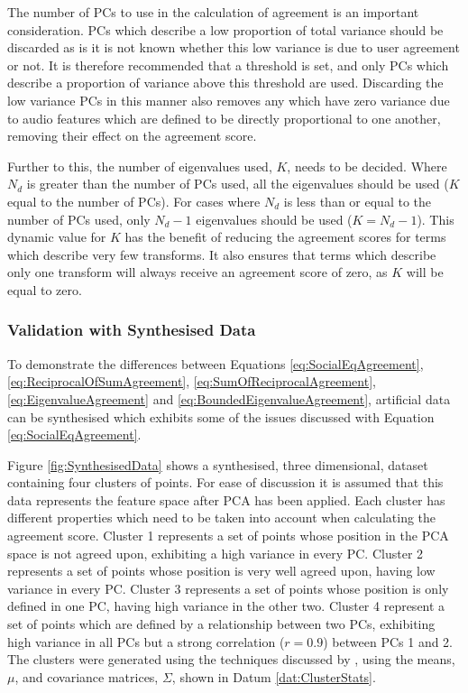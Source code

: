 			The number of PCs to use in the calculation of agreement is an important consideration. PCs which
			describe a low proportion of total variance should be discarded as is it is not known whether this
			low variance is due to user agreement or not. It is therefore recommended that a threshold is set,
			and only PCs which describe a proportion of variance above this threshold are used. Discarding the
			low variance PCs in this manner also removes any which have zero variance due to audio features
			which are defined to be directly proportional to one another, removing their effect on the
			agreement score.

			Further to this, the number of eigenvalues used, $K$, needs to be decided. Where $N_{d}$ is greater
			than the number of PCs used, all the eigenvalues should be used ($K$ equal to the number of PCs).
			For cases where $N_{d}$ is less than or equal to the number of PCs used, only $N_{d} - 1$
			eigenvalues should be used ($K = N_{d} - 1$). This dynamic value for $K$ has the benefit of
			reducing the agreement scores for terms which describe very few transforms. It also ensures that
			terms which describe only one transform will always receive an agreement score of zero, as $K$ will
			be equal to zero.

		\subsubsection*{Validation with Synthesised Data}
			To demonstrate the differences between Equations \ref{eq:SocialEqAgreement},
			\ref{eq:ReciprocalOfSumAgreement}, \ref{eq:SumOfReciprocalAgreement}, \ref{eq:EigenvalueAgreement}
			and \ref{eq:BoundedEigenvalueAgreement}, artificial data can be synthesised which exhibits some of
			the issues discussed with Equation \ref{eq:SocialEqAgreement}.
			
			Figure \ref{fig:SynthesisedData} shows a synthesised, three dimensional, dataset containing four
			clusters of points. For ease of discussion it is assumed that this data represents the feature
			space after PCA has been applied. Each cluster has different properties which need to be taken into
			account when calculating the agreement score. Cluster 1 represents a set of points whose position
			in the PCA space is not agreed upon, exhibiting a high variance in every PC. Cluster 2 represents a
			set of points whose position is very well agreed upon, having low variance in every PC. Cluster 3
			represents a set of points whose position is only defined in one PC, having high variance in the
			other two. Cluster 4 represent a set of points which are defined by a relationship between two PCs,
			exhibiting high variance in all PCs but a strong correlation ($r = 0.9$) between PCs 1 and 2. The
			clusters were generated using the techniques discussed by \citet{ripley1987stochastic}, using the
			means, $\mu$, and covariance matrices, $\Sigma$, shown in Datum \ref{dat:ClusterStats}.

